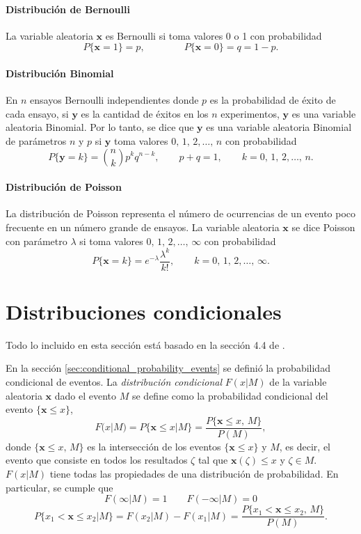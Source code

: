 \documentclass[a4paper]{report}
\newcommand{\x}{\mathbf{x}}
\newcommand{\y}{\mathbf{y}}
\begin{document}
\paragraph{Distribución de Bernoulli} 

La variable aleatoria \(\x\) es Bernoulli si toma valores 0 o 1 con probabilidad
\[
 P\{\x=1\}=p,\qquad\qquad P\{\x=0\}=q=1-p.
\]

\paragraph{Distribución Binomial}

En \(n\) ensayos Bernoulli independientes donde \(p\) es la probabilidad de éxito de cada ensayo, si \(\y\) es la cantidad de éxitos en los \(n\) experimentos, \(\y\) es una variable aleatoria Binomial. Por lo tanto, se dice que \(\y\) es una variable aleatoria Binomial de parámetros \(n\) y \(p\) si \(\y\) toma valores \(0,\,1,\,2,\dots,\,n\) con probabilidad
\[
 P\{\y=k\}=\binom{n}{k}p^{k}q^{n-k},\qquad p+q=1,\qquad k=0,\,1,\,2,\dots,\,n.
\]

\paragraph{Distribución de Poisson}

La distribución de Poisson representa el número de ocurrencias de un evento poco frecuente en un número grande de ensayos. La variable aleatoria \(\x\) se dice Poisson con parámetro \(\lambda\) si toma valores \(0,\,1,\,2,\dots,\,\infty\) con probabilidad
\[
 P\{\x=k\}=e^{-\lambda}\frac{\lambda^k}{k!},\qquad k=0,\,1,\,2,\dots,\,\infty.
\]

\section{Distribuciones condicionales}\label{sec:conditional_distributions}

Todo lo incluido en esta sección está basado en la sección 4.4 de \cite{papoulis2002probability}.

En la sección \ref{sec:conditional_probability_events} se definió la probabilidad condicional de eventos. La \emph{distribución condicional} \(F(x|M)\) de la variable aleatoria \(\x\) dado el evento \(M\) se define como la probabilidad condicional del evento \(\{\x\leq x\}\),
\begin{equation}\label{eq:conditional_distribution_definition}
 F(x|M)=P\{\x\leq x|M\}=\frac{P\{\x\leq x,\,M\}}{P(M)},
\end{equation}
donde \(\{\x\leq x,\,M\}\) es la intersección de los eventos \(\{\x\leq x\}\) y \(M\), es decir, el evento que consiste en todos los resultados \(\zeta\) tal que \(\x(\zeta)\leq x\) y \(\zeta\in M\). \(F(x|M)\) tiene todas las propiedades de una distribución de probabilidad. En particular, se cumple que
\[
 F(\infty|M)=1\qquad F(-\infty|M)=0
\]
\[
 P\{x_1<\x\leq x_2|M\}=F(x_2|M)-F(x_1|M)=\frac{P\{x_1<\x\leq x_2,\,M\}}{P(M)}.
\]
\end{document}
